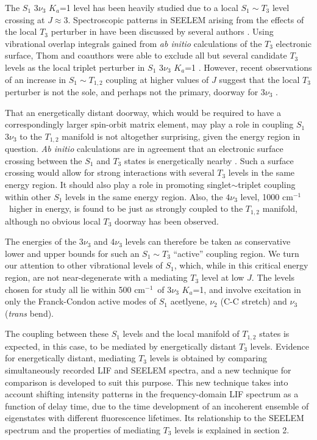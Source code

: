\documentclass[12pt,draft]{mitthesis}
\newcommand{\POINT}[1]{\textcolor{magenta}{#1}}
\newcommand{\rcm}{cm$^{-1}$}
\begin{document}
The $S_1$ $3 \nu_3$ $K_a$=1 level has been heavily studied due to a
local $S_1 \sim T_3$ level crossing at $J \approx 3$.  Spectroscopic
patterns in SEELEM arising from the effects of the local $T_3$
perturber in have been discussed by several authors \cite{humphrey97,
  altunata00, altunata01, mishra04}.  Using vibrational overlap
integrals gained from \emph{ab initio} calculations of the $T_3$
electronic surface, Thom and coauthors were able to exclude all but
several candidate $T_3$ levels as the local triplet perturber in $S_1$
$3 \nu_3$ $K_a$=1 \cite{thom07}.
However, recent observations of an increase in $S_1 \sim T_{1,2}$
coupling at higher values of $J$ suggest that the local $T_3$
perturber is not the sole, and perhaps not the primary, doorway for
$3 \nu_3$ \cite{degroot07}.

That an energetically distant doorway, which would be required to have
a correspondingly larger spin-orbit matrix element, may play a role in
coupling $S_1$ $3 \nu_3$ to the $T_{1,2}$ manifold is not altogether
surprising, given the energy region in question.  \emph{Ab initio}
calculations are in agreement that an electronic surface crossing
between the $S_1$ and $T_3$ states is energetically nearby
\cite{ventura03, thom07}.  Such a surface crossing would allow for
strong interactions with several $T_3$ levels in the same energy
region.  It should also play a role in promoting singlet$\sim$triplet
coupling within other $S_1$ levels in the same energy region.  Also,
the $4\nu_3$ level, 1000 \rcm\ higher in energy, is found to be just
as strongly coupled to the $T_{1,2}$ manifold, although no obvious
local $T_3$ doorway has been observed.

The energies of the $3 \nu_3$ and $4\nu_3$ levels can therefore be
taken as conservative lower and upper bounds for such an $S_1 \sim
T_3$ ``active'' coupling region.  We turn our attention to other
vibrational levels of $S_1$, which, while in this critical energy
region, are not near-degenerate with a mediating $T_3$ level at low
$J$.  The levels chosen for study all lie within 500 \rcm\ of $3
\nu_3$ $K_a$=1, and involve excitation in only the Franck-Condon
active modes of $S_1$ acetlyene, $\nu_2$ (C-C stretch) and $\nu_3$
(\emph{trans} bend).

The coupling between these $S_1$ levels and the local manifold of
$T_{1,2}$ states is expected, in this case, to be mediated by
energetically distant $T_3$ levels.  Evidence for energetically
distant, mediating $T_3$ levels is obtained by comparing
simultaneously recorded LIF and SEELEM spectra, and a new technique
for comparison is developed to suit this purpose.  This new technique
takes into account shifting intensity patterns in the frequency-domain
LIF spectrum as a function of delay time, due to the time development
of an incoherent ensemble of eigenstates with different fluorescence
lifetimes. Its relationship to the SEELEM spectrum and the properties
of mediating $T_3$ levels is explained in section 2.
\end{document}
